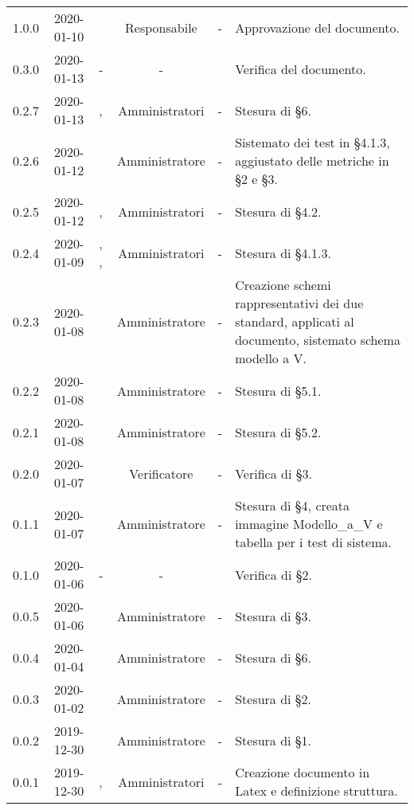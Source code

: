 {\begin{longtable}{ c c  C{2.5cm} c c C{3.5cm}}
1.0.0 & 2020-01-10 & \SE{} & Responsabile & - & Approvazione del documento. \\
0.3.0 & 2020-01-13 & - & - & \LD{} & Verifica del documento. \\
0.2.7 & 2020-01-13 & \MC{}, \AT{} & Amministratori & - & Stesura di §6. \\
0.2.6 & 2020-01-12 & \AT{} & Amministratore & - & Sistemato dei test in §4.1.3, aggiustato delle metriche in §2 e §3. \\
0.2.5 & 2020-01-12 & \MC{}, \BR{} & Amministratori & - & Stesura di §4.2. \\
0.2.4 & 2020-01-09 & \MC{}, \AT{}, \BR{} & Amministratori & - & Stesura di §4.1.3. \\
0.2.3 & 2020-01-08 & \AT{} & Amministratore & - & Creazione schemi rappresentativi dei due standard, applicati al documento, sistemato schema modello a V. \\
0.2.2 & 2020-01-08 & \MC{} & Amministratore & - & Stesura di §5.1. \\
0.2.1 & 2020-01-08 & \AT{} & Amministratore & - & Stesura di §5.2. \\
0.2.0 & 2020-01-07 & \DF{} & Verificatore & - & Verifica di §3. \\
0.1.1 & 2020-01-07 & \AT{} & Amministratore & - & Stesura di §4, creata immagine Modello\_a\_V e tabella per i test di sistema. \\
0.1.0 & 2020-01-06 & - & - & \LD{} & Verifica di §2. \\
0.0.5 & 2020-01-06 & \BR{} & Amministratore & - & Stesura di §3. \\
0.0.4 & 2020-01-04 & \MC{} & Amministratore & - & Stesura di §6. \\
0.0.3 & 2020-01-02 & \MC{} & Amministratore & - & Stesura di §2. \\
0.0.2 & 2019-12-30 & \AT{} & Amministratore & - & Stesura di §1. \\
0.0.1 & 2019-12-30 & \AT{}, \MC{} & Amministratori & - & Creazione documento in Latex e definizione struttura. \\	
		
\end{longtable}
}

